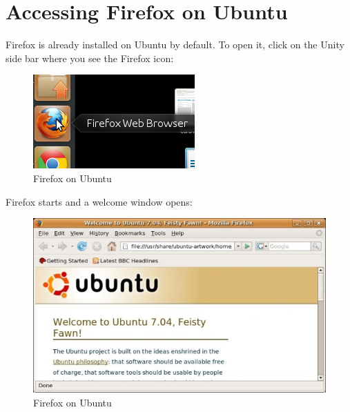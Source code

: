 \section{Accessing Firefox on Ubuntu}

Firefox is already installed on Ubuntu by default. To open it, click on
the Unity side bar where you see the Firefox icon:

\begin{figure}[htbp]
\centering
\includegraphics{ff_ubuntu_1.png}
\caption{Firefox on Ubuntu}
\end{figure}

Firefox starts and a welcome window opens:

\begin{figure}[htbp]
\centering
\includegraphics{ff_ubuntu_2.png}
\caption{Firefox on Ubuntu}
\end{figure}

